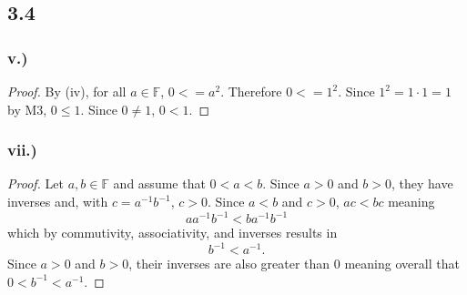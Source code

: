 \documentclass[12pt,titlepage]{extarticle}
\begin{document}
\subsection*{3.4}
\subsubsection*{v.)}
\begin{proof}
	By (iv), for all $a \in \mathbb{F}$, $0 <= a^2$. Therefore $0 <= 1^2$. Since $1^2 = 1\cdot 1 = 1$ by M3, $0 \leq 1$. Since $0 \neq 1$, $0 < 1$.
\end{proof}

\subsubsection*{vii.)}
\begin{proof}
	Let $a,b \in \mathbb{F}$ and assume that $0 < a < b$. Since $a > 0$ and $b > 0$, they have inverses and, with $c = a^{-1} b^{-1}$, $c > 0$. Since $a < b$ and $c > 0$, $ac < bc$ meaning
	\[
		aa^{-1}b^{-1} < ba^{-1}b^{-1}
	\]
	which by commutivity, associativity, and inverses results in
	\[
		b^{-1} < a^{-1}
	.\]
	Since $a > 0$ and $b > 0$, their inverses are also greater than $0$ meaning overall
 that $0 < b^{-1} < a^{-1}$.
\end{proof}
\end{document}

